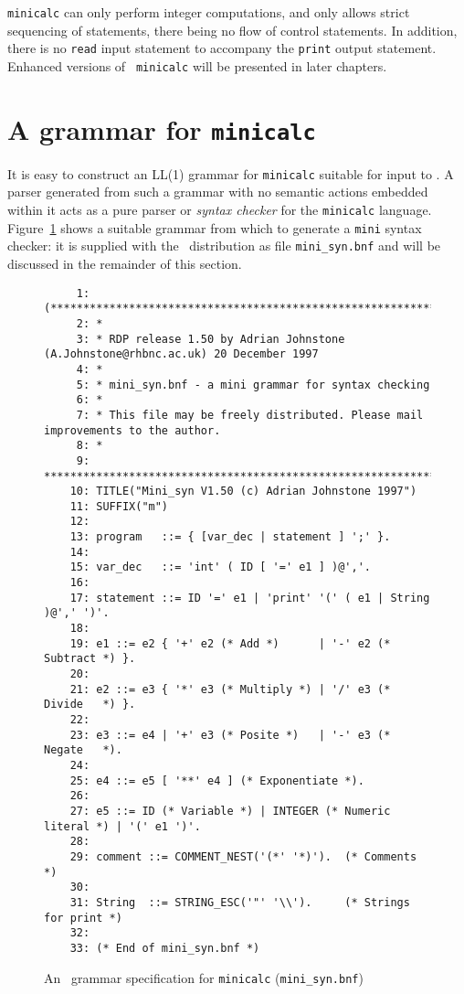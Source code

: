 {\tt minicalc} can only perform integer computations, and only allows
strict sequencing of statements, there being no flow of control
statements. In addition, there is no {\tt read} input statement to
accompany the {\tt print} output statement. Enhanced versions of {\tt
minicalc} will be presented in later chapters.

\section{A grammar for {\tt minicalc}}

It is easy to construct an LL(1) grammar for {\tt minicalc} suitable for
input to \rdp. A parser generated from such a grammar with no semantic
actions embedded within it acts as a pure parser or {\em syntax checker}
for the {\tt minicalc} language. Figure~\ref{minicalc:grammar} shows a
suitable grammar from which to generate a {\tt mini} syntax checker: it is supplied with
the \rdp\ distribution as file \verb+mini_syn.bnf+ and will be discussed in the
remainder of this section.

\begin{figure}
\hspace*{-1cm}
\begin{minipage}{30cm}
\footnotesize
\begin{verbatim}
     1: (*******************************************************************************
     2: *
     3: * RDP release 1.50 by Adrian Johnstone (A.Johnstone@rhbnc.ac.uk) 20 December 1997
     4: *
     5: * mini_syn.bnf - a mini grammar for syntax checking
     6: *
     7: * This file may be freely distributed. Please mail improvements to the author.
     8: *
     9: *******************************************************************************)
    10: TITLE("Mini_syn V1.50 (c) Adrian Johnstone 1997")
    11: SUFFIX("m")
    12: 
    13: program   ::= { [var_dec | statement ] ';' }.
    14: 
    15: var_dec   ::= 'int' ( ID [ '=' e1 ] )@','.
    16: 
    17: statement ::= ID '=' e1 | 'print' '(' ( e1 | String )@',' ')'.
    18: 
    19: e1 ::= e2 { '+' e2 (* Add *)      | '-' e2 (* Subtract *) }.         
    20: 
    21: e2 ::= e3 { '*' e3 (* Multiply *) | '/' e3 (* Divide   *) }.         
    22: 
    23: e3 ::= e4 | '+' e3 (* Posite *)   | '-' e3 (* Negate   *).
    24: 
    25: e4 ::= e5 [ '**' e4 ] (* Exponentiate *).
    26: 
    27: e5 ::= ID (* Variable *) | INTEGER (* Numeric literal *) | '(' e1 ')'.
    28: 
    29: comment ::= COMMENT_NEST('(*' '*)').  (* Comments *)
    30: 
    31: String  ::= STRING_ESC('"' '\\').     (* Strings for print *)
    32: 
    33: (* End of mini_syn.bnf *)
\end{verbatim}
\end{minipage}
\caption{An \rdp\ grammar specification for {\tt minicalc} ({\tt mini\_syn.bnf})}
\label{minicalc:grammar}
\end{figure}

